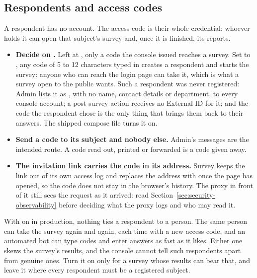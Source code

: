\documentclass[11pt, a4paper]{article}
\begin{document}
\subsection{Respondents and access codes}
\label{sec:security-access-codes}

A respondent has no account. The access code is their whole credential: whoever holds it can
open that subject's survey and, once it is finished, its reports.

\begin{itemize}
  \item \textbf{Decide on .} Left at , only a code
        the console issued reaches a survey. Set to , any code of 5 to 12 characters
        typed in creates a respondent and starts the survey: anyone who can reach the login page
        can take it, which is what a survey open to the public wants. Such a respondent was never
        registered: Admin lists it as , with no name, contact details or
        department, to every console account; a post-survey action receives no External ID for
        it; and the code the respondent chose is the only thing that brings them back to their
        answers. The shipped compose file turns it on.
  \item \textbf{Send a code to its subject and nobody else.} Admin's messages are the intended
        route. A code read out, printed or forwarded is a code given away.
  \item \textbf{The invitation link carries the code in its address.} Survey keeps the link
        out of its own access log and replaces the address with  once the page has
        opened, so the code does not stay in the browser's history. The proxy in front of it
        still sees the request as it arrived: read Section~\ref{sec:security-observability}
        before deciding what the proxy logs and who may read it.
\end{itemize}

\begin{elicitcaution}
With  on in production, nothing ties a respondent to a person. The
same person can take the survey again and again, each time with a new access code, and an
automated bot can type codes and enter answers as fast as it likes. Either one skews the
survey's results, and the console cannot tell such respondents apart from genuine ones. Turn it
on only for a survey whose results can bear that, and leave it  where every
respondent must be a registered subject.
\end{elicitcaution}
\end{document}
